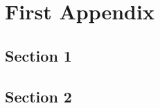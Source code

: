 \chapter{First Appendix}\label{app:firstAppendix}
  \section{Section 1}\label{sec:A1section1}
    \lipsum[34-36]
  \section{Section 2}\label{sec:A1section2}
    \lipsum[38]